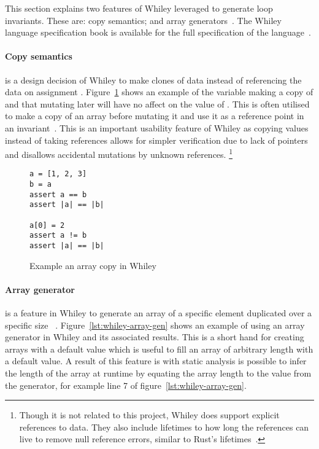 This section explains two features of Whiley leveraged to generate loop invariants.
These are: copy semantics; and array generators~\cite{whiley-design}.
The Whiley language specification book is available for the full
specification of the language~\cite{whiley-spec}.

\paragraph{Copy semantics} is a design decision of Whiley to
make clones of data instead of referencing the data on assignment \cite{whiley-arrays}.
Figure~\ref{lst:whiley-array-copy} shows an example of the variable
 making a copy of  and that mutating  later
will have no affect on the value of .
This is often utilised to make a copy of an array before mutating it
and use it as a reference point in an invariant~\cite{whiley-arrays}.
This is an important usability feature of Whiley as copying values
instead of taking references allows for simpler verification due to lack
of pointers and disallows accidental mutations by unknown references.
\footnote{
Though it is not related to this project,
Whiley does support explicit references to data.
They also include lifetimes to how long the references can live
to remove null reference errors, similar to Rust's lifetimes~\cite{rust-lang}.
}

\begin{figure}[ht]
\begin{lstlisting}
a = [1, 2, 3]
b = a
assert a == b
assert |a| == |b|

a[0] = 2
assert a != b
assert |a| == |b|
\end{lstlisting}
\caption{Example an array copy in Whiley}
\label{lst:whiley-array-copy}
\end{figure}

\paragraph{Array generator} is a feature in Whiley to generate an array
of a specific element duplicated over a specific size~\cite{whiley-spec}
\cite{whiley-arrays}.
Figure~\ref{lst:whiley-array-gen} shows an example of using an array generator
in Whiley and its associated results.
This is a short hand for creating arrays with a default value which is useful
to fill an array of arbitrary length with a default value.
A result of this feature is with static analysis is possible to infer the
length of the array at runtime by equating the array length to the value
from the generator, for example line 7 of figure~\ref{lst:whiley-array-gen}.

